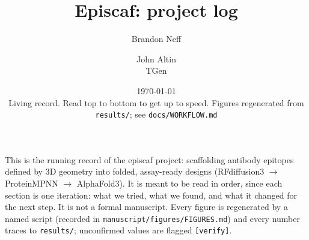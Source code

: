 \documentclass[11pt]{article}
\title{Episcaf: project log}
\author{Brandon Neff \and John Altin \\ \small TGen}
\date{\today\\[2pt]\small Living record. Read top to bottom to get up to speed.
Figures regenerated from \texttt{results/}; see \texttt{docs/WORKFLOW.md}}
\begin{document}
\maketitle

\noindent
This is the running record of the episcaf project: scaffolding antibody epitopes defined by
3D geometry into folded, assay-ready designs (RFdiffusion3 $\rightarrow$ ProteinMPNN
$\rightarrow$ AlphaFold3). It is meant to be read in order, since each section is one
iteration: what we tried, what we found, and what it changed for the next step. It is not a
formal manuscript. Every figure is regenerated by a named script (recorded in
\texttt{manuscript/figures/FIGURES.md}) and every number traces to \texttt{results/};
unconfirmed values are flagged \texttt{[verify]}.
















\end{document}

